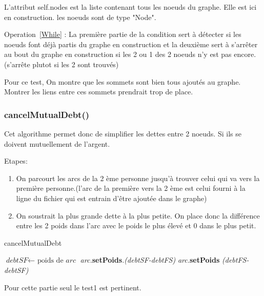 \documentclass[a4paper]{article}
\begin{document}
L'attribut self.nodes est la liste contenant tous les noeuds du graphe. Elle est ici en construction. les noeuds sont de type "Node".

Operation~\ref{While} : La première partie de la condition sert à détecter si les noeuds font déjà partis du graphe en construction et la deuxième sert à s'arrêter au bout du graphe en construction si les 2 ou 1 des 2 noeuds n'y est pas encore.(s'arrête plutot si les 2 sont trouvés)

Pour ce test, On montre que les sommets sont bien tous ajoutés au graphe. Montrer les liens entre ces sommets prendrait trop de place.
\begin{figure}[H]
\end{figure}
\begin{figure}[H]
\end{figure}	
\subsubsection{cancelMutualDebt()}
Cet algorithme permet donc de simplifier les dettes entre 2 noeuds. Si ils se doivent mutuellement de l'argent.

Etapes:
\begin{enumerate}
\item On parcourt les arcs de la 2 ème personne jusqu'à trouver celui qui va vers la première personne.(l'arc de la première vers la 2 ème est celui fourni à la ligne du fichier qui est entrain d'être ajoutée dans le graphe)
\item On soustrait la plus grande dette à la plus petite. On place donc la différence entre les 2 poids dans l'arc avec le poids le plus élevé et 0 dans le plus petit.
\end{enumerate}
\begin{algorithm}[H]
\caption{cancelMutualDebt}\label{cancelMutualDebt}
\begin{algorithmic}[1]
\State $\textit{debtSF} \gets \text{ poids de } \textit{arc}$
\State \textit{arc.}\textbf{setPoids}\textit{.(debtSF-debtFS)}
\State {}
\Else
\State \textit{arc.}\textbf{setPoids}
\State {} \textit{(debtFS-debtSF)}
\EndIf
\EndIf
\EndFor
{}
\EndProcedure
\end{algorithmic}
\end{algorithm}
Pour cette partie seul le test1 est pertinent.
\begin{figure}[H]
\end{figure}
\end{document}
